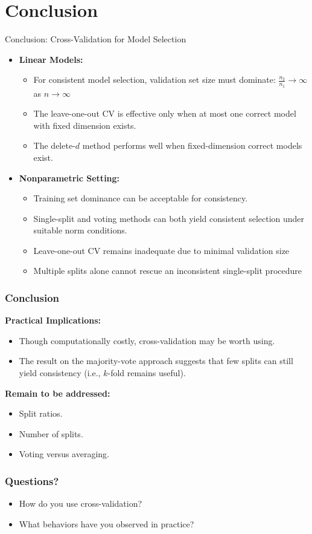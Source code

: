 \documentclass{beamer}
\newcommand{\0}{\emptyset}
\newcommand{\1}{\mathmybb{1}}
\begin{document}
\section{Conclusion}
\begin{frame}{Conclusion: Cross-Validation for Model Selection}
    \begin{itemize}
      \item \textbf{Linear Models:}
        \begin{itemize}
          \item For consistent model selection, validation set size must dominate: $\frac{n_2}{n_1} \to \infty$ as $n \to \infty$
          \item The leave-one-out CV is effective only when at most one correct model with fixed dimension exists.
          \item The delete-\(d\) method performs well when fixed-dimension correct models exist.
        \end{itemize}
      \item \textbf{Nonparametric Setting:}
        \begin{itemize}
          \item Training set dominance can be acceptable for consistency.
          \item Single-split and voting methods can both yield consistent selection under suitable norm conditions.
          \item Leave-one-out CV remains inadequate due to minimal validation size
          \item Multiple splits alone cannot rescue an inconsistent single-split procedure
        \end{itemize}
    \end{itemize}
\end{frame}

\begin{frame}
    \frametitle{Conclusion}
    \textbf{Practical Implications:}
        \begin{itemize}
            \item Though computationally costly, cross-validation may be worth using.
            \item The result on the majority-vote approach suggests that few splits can still yield consistency (i.e., \(k\)-fold remains useful).
        \end{itemize}
    \textbf{Remain to be addressed:}
        \begin{itemize}
            \item Split ratios.
            \item Number of splits.
            \item Voting versus averaging.
        \end{itemize}
\end{frame}

\begin{frame}
    \frametitle{Questions?}

    \begin{itemize}
        \item How do you use cross-validation?
        \item What behaviors have you observed in practice?
    \end{itemize}

    

\end{frame}
\end{document}
